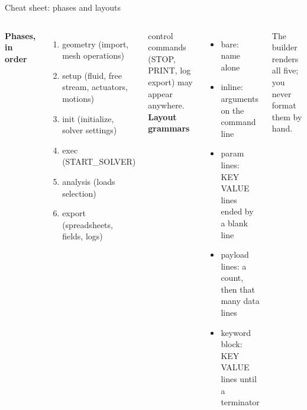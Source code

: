 \documentclass[aspectratio=169,10pt]{beamer}
\begin{document}
\begin{frame}{Cheat sheet: phases and layouts}
  \small
  \begin{columns}[T]
    \textbf{Phases, in order}
    \begin{enumerate}
      \item geometry (import, mesh operations)
      \item setup (fluid, free stream, actuators, motions)
      \item init (initialize, solver settings)
      \item exec (START\_SOLVER)
      \item analysis (loads selection)
      \item export (spreadsheets, fields, logs)
    \end{enumerate}
    control commands (STOP, PRINT, log export) may appear anywhere.
    \textbf{Layout grammars}
    \begin{itemize}
      \item bare: name alone
      \item inline: arguments on the command line
      \item param lines: KEY VALUE lines ended by a blank line
      \item payload lines: a count, then that many data lines
      \item keyword block: KEY VALUE lines until a terminator
    \end{itemize}
    The builder renders all five; you never format them by hand.
  \end{columns}
\end{frame}
\end{document}
